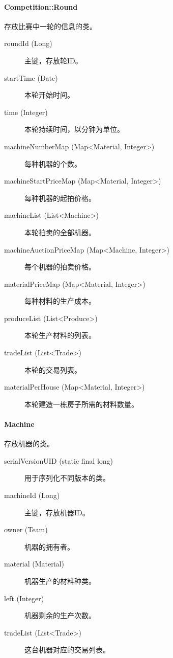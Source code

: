 \documentclass{article}
\begin{document}
\paragraph{Competition::Round}
存放比赛中一轮的信息的类。
\begin{description}
  \item[roundId (Long)] 主键，存放轮ID。
  \item[startTime (Date)] 本轮开始时间。
  \item[time (Integer)] 本轮持续时间，以分钟为单位。
  \item[machineNumberMap (Map<Material, Integer>)] 每种机器的个数。
  \item[machineStartPriceMap (Map<Material, Integer>)] 每种机器的起拍价格。
  \item[machineList (List<Machine>)] 本轮拍卖的全部机器。
  \item[machineAuctionPriceMap (Map<Machine, Integer>)] 每个机器的拍卖价格。
  \item[materialPriceMap (Map<Material, Integer>)] 每种材料的生产成本。
  \item[produceList (List<Produce>)] 本轮生产材料的列表。
  \item[tradeList (List<Trade>)] 本轮的交易列表。
  \item[materialPerHouse (Map<Material, Integer>)] 本轮建造一栋房子所需的材料数量。
\end{description}

\paragraph{Machine}
存放机器的类。
\begin{description}
  \item[serialVersionUID (static final long)] 用于序列化不同版本的类。
  \item[machineId (Long)] 主键，存放机器ID。
  \item[owner (Team)] 机器的拥有者。
  \item[material (Material)] 机器生产的材料种类。
  \item[left (Integer)] 机器剩余的生产次数。
  \item[tradeList (List<Trade>)] 这台机器对应的交易列表。
\end{description}
\end{document}
